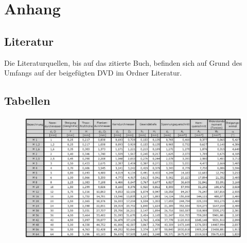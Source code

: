 {}

\listoffigures

{}

\listoftables


{}










{}

\captionsetup{listof=false}

\chapter*{Anhang}

\pagestyle{plain}

\section*{Literatur}

Die Literaturquellen, bis auf das zitierte Buch, befinden sich auf Grund des Umfangs auf der beigefügten DVD im Ordner \glqq Literatur\grqq .

\clearpage

\section*{Tabellen}

\begin{figure}[h!]  
	\begin{center}
		\includegraphics[page=1, scale=0.7, angle=90]{Anhang/Gewindetabelle.png}	
	\end{center}
\end{figure}

